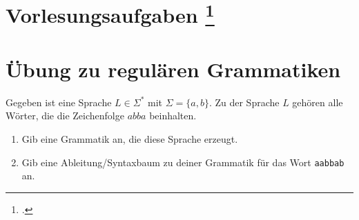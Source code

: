 \documentclass{lehramt-informatik-aufgabe}
\begin{document}
\section{Vorlesungsaufgaben
\footcite{theoinf:ab:1}}

\section{Übung zu regulären Grammatiken}

Gegeben ist eine Sprache $L \in \Sigma^*$ mit $\Sigma = \{a ,b\}$. Zu
der Sprache $L$ gehören alle Wörter, die die Zeichenfolge $abba$
beinhalten.

\begin{enumerate}
\item Gib eine Grammatik an, die diese Sprache erzeugt.

\item Gib eine Ableitung/Syntaxbaum zu deiner Grammatik für das Wort
\texttt{aabbab} an.
\end{enumerate}
\end{document}
